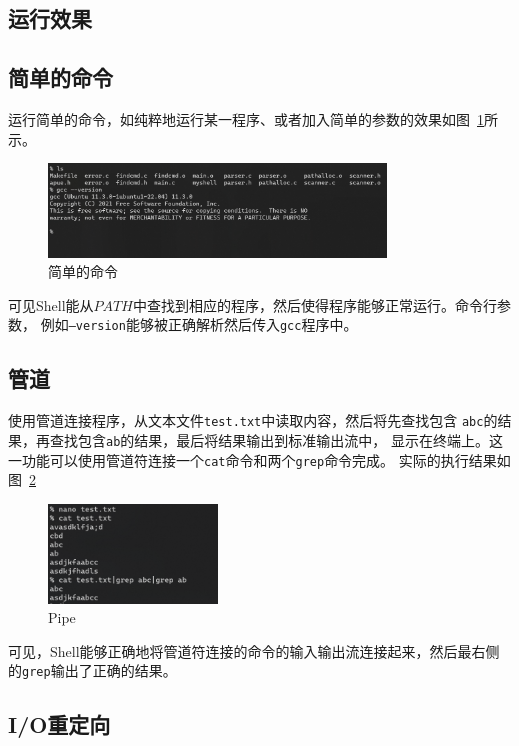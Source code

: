 \documentclass[a4paper,twoside]{article}
\begin{document}
\begin{spacing}{1.2}
\section{运行效果}

\subsection{简单的命令}

运行简单的命令，如纯粹地运行某一程序、或者加入简单的参数的效果如图~\ref{fig:simple}所示。
\begin{figure}[htb]
	\centering
	\caption{简单的命令}
	\label{fig:simple}
	\includegraphics[width=0.8\textwidth]{simple.png}
\end{figure}
可见Shell能从$PATH$中查找到相应的程序，然后使得程序能够正常运行。命令行参数，
例如\texttt{--version}能够被正确解析然后传入\texttt{gcc}程序中。

\subsection{管道}

使用管道连接程序，从文本文件\texttt{test.txt}中读取内容，然后将先查找包含
\texttt{abc}的结果，再查找包含\texttt{ab}的结果，最后将结果输出到标准输出流中，
显示在终端上。这一功能可以使用管道符连接一个\texttt{cat}命令和两个\texttt{grep}命令完成。
实际的执行结果如图~\ref{fig:pipe}
\begin{figure}[htb]
	\centering
	\caption{Pipe}
	\label{fig:pipe}
	\includegraphics[width=0.4\textwidth]{pipe.png}
\end{figure}
可见，Shell能够正确地将管道符连接的命令的输入输出流连接起来，然后最右侧的\texttt{grep}输出了正确的结果。

\subsection{I/O重定向}


\end{spacing}
\end{document}
